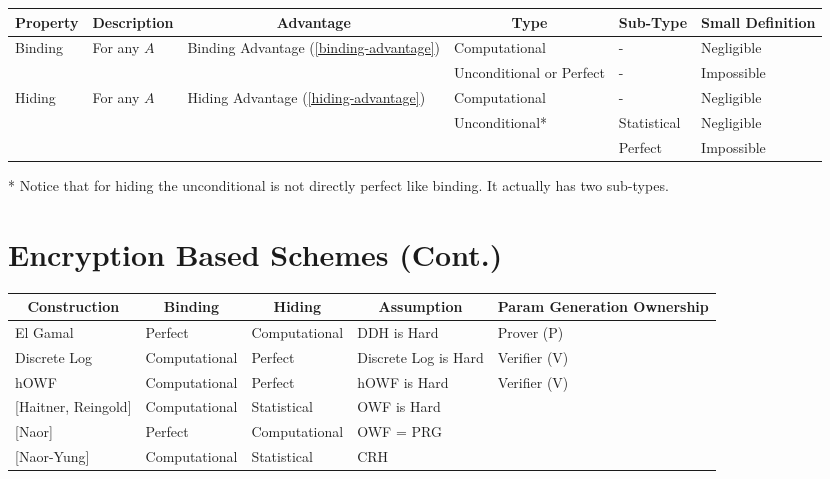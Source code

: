 \documentclass{article}
\begin{document}
\begin{table}[h]
\begin{tabular}{|l|l|l|l|l|l|}
\hline
\multicolumn{1}{|c|}{\textbf{Property}} &
  \multicolumn{1}{c|}{\textbf{Description}} &
  \multicolumn{1}{c|}{\textbf{Advantage}} &
  \multicolumn{1}{c|}{\textbf{Type}} &
  \textbf{Sub-Type} &
  \textbf{Small Definition} \\ \hline
\multirow{2}{*}{Binding} &
  \multirow{2}{*}{For any $A$} &
  \multirow{2}{*}{Binding Advantage (\ref{binding-advantage})} &
  Computational &
  - &
  Negligible \\ \cline{4-6} 
 &
   &
   &
  Unconditional or Perfect &
  - &
  Impossible \\ \hline
\multirow{3}{*}{Hiding} &
  \multirow{3}{*}{For any $A$} &
  \multirow{3}{*}{Hiding Advantage (\ref{hiding-advantage})} &
  Computational &
  - &
  Negligible \\ \cline{4-6} 
 &
   &
   &
  \multirow{2}{*}{Unconditional*} &
  Statistical &
  Negligible \\ \cline{5-6} 
 &
   &
   &
   &
  Perfect &
  Impossible \\ \hline
\end{tabular}
\end{table}

* Notice that for hiding the unconditional is not directly perfect like binding. It actually has two sub-types.


\section{Encryption Based Schemes (Cont.)}

\begin{table}[h]
\begin{tabular}{|l|l|l|l|l|}
\hline
\multicolumn{1}{|c|}{\textbf{Construction}} &
  \multicolumn{1}{c|}{\textbf{Binding}} &
  \multicolumn{1}{c|}{\textbf{Hiding}} &
  \multicolumn{1}{c|}{\textbf{Assumption}} &
  \multicolumn{1}{c|}{\textbf{Param Generation Ownership}} \\ \hline
El Gamal                             & Perfect       & Computational & DDH is Hard                        & Prover (P) \\ \hline
Discrete Log                         & Computational & Perfect       & Discrete Log is Hard               & Verifier (V) \\ \hline
hOWF & Computational & Perfect       & hOWF is Hard                       & Verifier (V) \\ \hline
{[}Haitner, Reingold{]}              & Computational & Statistical   & OWF is Hard                        &              \\ \hline
{[}Naor{]}                           & Perfect       & Computational & OWF = PRG &              \\ \hline
{[}Naor-Yung{]}                      & Computational & Statistical   & CRH &              \\ \hline
\end{tabular}
\end{table}
\end{document}
